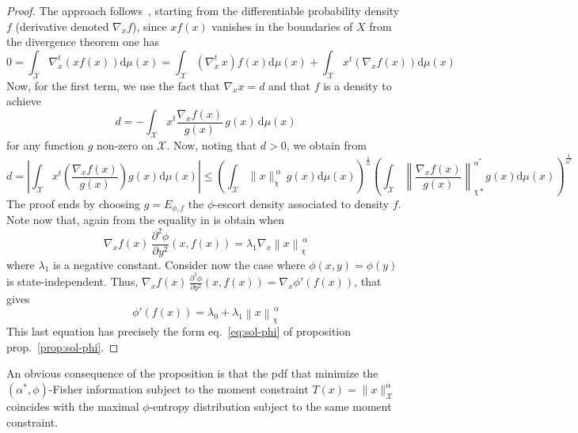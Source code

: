 \documentclass[english,sort&compress]{elsarticle}
\theoremstyle{definition}
\theoremstyle{plain}
\theoremstyle{plain}
\def\dmu{\mathrm{d}\mu}
\def\X{\mathcal{X}}
\begin{document}
\begin{proof}
  The   approach   follows~\cite{Ber13},   starting  from   the   differentiable
  probability  density $f$  (derivative denoted  $\nabla_x f$),  since  $x f(x)$
  vanishes in the boundaries of $X$ from the divergence theorem one has
  \[
  0  =  \int_\X  \nabla_x^t \left(  x  f(x)  \right)  \dmu(x) =  \int_\X  \left(
    \nabla_x^t  \, x \right)  f(x) \dmu(x)  + \int_\X  x^t \left(  \nabla_x f(x)
  \right) \dmu(x)
  \]
  Now, for the first term, we use the fact that $\nabla_x x = d$ and that $f$ is
  a density to achieve
  \[
  d = - \int_\X x^t \frac{\nabla_x f(x)}{g(x)} \, g(x) \, \dmu(x)
  \]
  for any function  $g$ non-zero on $\X$.   Now, noting that $d >  0$, we obtain
  from \cite[Lemma 2]{Ber13}
  \[
  d  =  \left| \int_\X x^t \left( \frac{\nabla_x f(x)}{g(x)} \right) g(x)
  \dmu(x) \right| \le  \left( \int_\X \|x\|_\chi^{\: \alpha} \, g(x) \dmu(x)
  \right)^{\frac{1}{\alpha}} \left( \int_\X \left\| \frac{\nabla_x
  f(x)}{g(x)}\right\|_{\chi*}^{\alpha^*} g(x) \dmu(x) \right)^{\frac{1}{\alpha^*}}
  \]
  The  proof  ends  by  choosing  $g =  E_{\phi,f}$  the  $\phi$-escort  density
  associated to density $f$. Note now that, again from \cite[Lemma~2]{Ber13} the
  equality in is obtain when
  \[
  \nabla_x  f(x) \,  \frac{\partial^2 \phi}{\partial  y^2} (x,f(x))  = \lambda_1
  \nabla_x \left\| x \right\|_\chi^{\, \alpha}
  \]
  where  $\lambda_1$  is a  negative  constant.   Consider  now the  case  where
  $\phi(x,y)  =   \phi(y)$  is   state-independent.  Thus,  $\nabla_x   f(x)  \,
  \frac{\partial^2  \phi}{\partial y^2} (x,f(x))  = \nabla_x  \phi'(f(x))$, that
  gives
  \[
  \phi'(f(x)) = \lambda_0 + \lambda_1 \left\| x \right\|_\chi^{\, \alpha}
  \]
  This  last   equation  has   precisely  the  form   eq.~\eqref{eq:sol-phi}  of
  proposition prop.~\ref{prop:sol-phi}.
\end{proof}
%
An obvious  consequence of  the proposition  is that the  pdf that  minimize the
$(\alpha^*,\phi)$-Fisher information  subject to  the moment constraint  $T(x) =
\|x\|_\X^\alpha$ coincides with  the maximal $\phi$-entropy distribution subject
to the same moment constraint.
\end{document}

